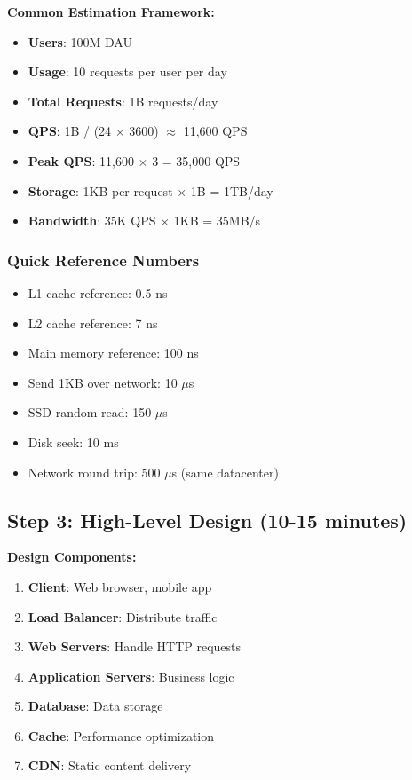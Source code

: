 \documentclass[10pt,a4paper]{article}
\begin{document}
\begin{scaleBox}
\textbf{Common Estimation Framework:}
\begin{itemize}
\item \textbf{Users}: 100M DAU
\item \textbf{Usage}: 10 requests per user per day
\item \textbf{Total Requests}: 1B requests/day
\item \textbf{QPS}: 1B / (24 $\times$ 3600) $\approx$ 11,600 QPS
\item \textbf{Peak QPS}: 11,600 $\times$ 3 = 35,000 QPS
\item \textbf{Storage}: 1KB per request $\times$ 1B = 1TB/day
\item \textbf{Bandwidth}: 35K QPS $\times$ 1KB = 35MB/s
\end{itemize}
\end{scaleBox}

\subsubsection{Quick Reference Numbers}
\begin{itemize}
\item L1 cache reference: 0.5 ns
\item L2 cache reference: 7 ns
\item Main memory reference: 100 ns
\item Send 1KB over network: 10 $\mu$s
\item SSD random read: 150 $\mu$s
\item Disk seek: 10 ms
\item Network round trip: 500 $\mu$s (same datacenter)
\end{itemize}

\subsection{Step 3: High-Level Design (10-15 minutes)}

\begin{frameworkbox}
\textbf{Design Components:}
\begin{enumerate}
\item \textbf{Client}: Web browser, mobile app
\item \textbf{Load Balancer}: Distribute traffic
\item \textbf{Web Servers}: Handle HTTP requests
\item \textbf{Application Servers}: Business logic
\item \textbf{Database}: Data storage
\item \textbf{Cache}: Performance optimization
\item \textbf{CDN}: Static content delivery
\end{enumerate}
\end{frameworkbox}
\end{document}
